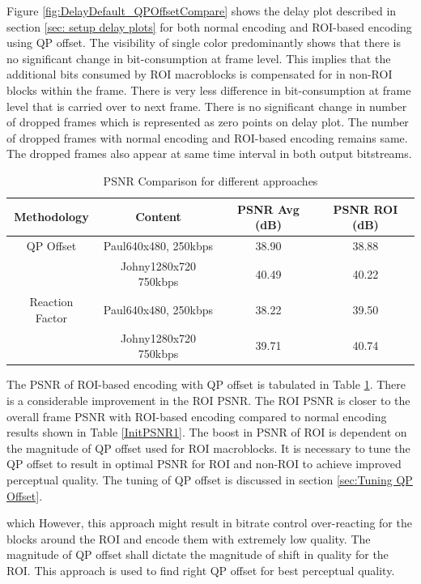 \documentclass[11pt]{article} %
\begin{document}
 Figure \ref{fig:DelayDefault_QPOffsetCompare} shows the delay plot described in section \ref{sec: setup delay plots} for both normal encoding and ROI-based encoding using QP offset. The visibility of single color predominantly shows that there is no significant change in bit-consumption at frame level. This implies that the additional bits consumed by ROI macroblocks is compensated for in non-ROI blocks within the frame. There is very less difference in bit-consumption at frame level that is carried over to next frame. There is no significant change in number of dropped frames which is represented as zero points on delay plot. The number of dropped frames with normal encoding and ROI-based encoding remains same. The dropped frames also appear at same time interval in both output bitstreams.
 
\begin{table} [h!]
\centering
\begin{tabular}{ |c|c|c|c| }
 \hline
Methodology & Content & PSNR Avg (dB) & PSNR ROI (dB) \\
 \hline 
QP Offset & Paul640x480, 250kbps & 38.90 & 38.88 \\ 
 & Johny1280x720 750kbps & 40.49 & 40.22 \\  
 \hline
Reaction Factor & Paul640x480, 250kbps & 38.22 & 39.50 \\ 
 & Johny1280x720 750kbps & 39.71 & 40.74 \\  
 \hline
\end{tabular}
 \caption{PSNR Comparison for different approaches}
 \label{AllPSNR1}
\end{table}

The PSNR of ROI-based encoding with QP offset is tabulated in Table \ref{AllPSNR1}. There is a considerable improvement in the ROI PSNR. The ROI PSNR is closer to the overall frame PSNR with ROI-based encoding compared to normal encoding results shown in Table \ref{InitPSNR1}. The boost in PSNR of ROI is dependent on the magnitude of QP offset used for ROI macroblocks. It is necessary to tune the QP offset to result in optimal PSNR for ROI and non-ROI to achieve improved perceptual quality. The tuning of QP offset is discussed in section \ref{sec:Tuning QP Offset}.


\iffalse
which However, this approach might result in bitrate control over-reacting for the blocks around the ROI and encode them with extremely low quality. The magnitude of QP offset shall dictate the magnitude of shift in quality for the ROI. This approach is used to find right QP offset for best perceptual quality.\\
\end{document}
